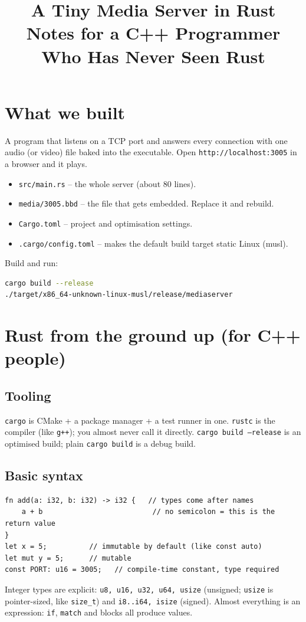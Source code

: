 \documentclass[11pt]{article}
\title{A Tiny Media Server in Rust\\\large Notes for a C++ Programmer Who Has Never Seen Rust}
\date{}
\begin{document}
\maketitle
\tableofcontents

\section{What we built}
A program that listens on a TCP port and answers every connection with one audio (or video) file baked into the executable. Open \texttt{http://localhost:3005} in a browser and it plays.

\begin{itemize}
\item \texttt{src/main.rs} -- the whole server (about 80 lines).
\item \texttt{media/3005.bbd} -- the file that gets embedded. Replace it and rebuild.
\item \texttt{Cargo.toml} -- project and optimisation settings.
\item \texttt{.cargo/config.toml} -- makes the default build target static Linux (musl).
\end{itemize}

Build and run:
\begin{lstlisting}[language=bash]
cargo build --release
./target/x86_64-unknown-linux-musl/release/mediaserver
\end{lstlisting}

\section{Rust from the ground up (for C++ people)}
\subsection{Tooling}
\texttt{cargo} is CMake + a package manager + a test runner in one. \texttt{rustc} is the compiler (like \texttt{g++}); you almost never call it directly. \texttt{cargo build --release} is an optimised build; plain \texttt{cargo build} is a debug build.

\subsection{Basic syntax}
\begin{lstlisting}
fn add(a: i32, b: i32) -> i32 {   // types come after names
    a + b                          // no semicolon = this is the return value
}
let x = 5;          // immutable by default (like const auto)
let mut y = 5;      // mutable
const PORT: u16 = 3005;   // compile-time constant, type required
\end{lstlisting}
Integer types are explicit: \texttt{u8, u16, u32, u64, usize} (unsigned; \texttt{usize} is pointer-sized, like \texttt{size\_t}) and \texttt{i8..i64, isize} (signed). Almost everything is an expression: \texttt{if}, \texttt{match} and blocks all produce values.
\end{document}
